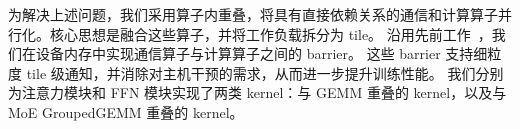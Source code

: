 为解决上述问题，我们采用算子内重叠，将具有直接依赖关系的通信和计算算子并行化。核心思想是融合这些算子，并将工作负载拆分为 tile。
沿用先前工作~\cite{jangda2022breaking, chang2024flux, zhang2025comet, zheng2025tilelink}，我们在设备内存中实现通信算子与计算算子之间的 barrier。
这些 barrier 支持细粒度 tile 级通知，并消除对主机干预的需求，从而进一步提升训练性能。
我们分别为注意力模块和 FFN 模块实现了两类 kernel：与 GEMM 重叠的 kernel，以及与 MoE GroupedGEMM 重叠的 kernel。





